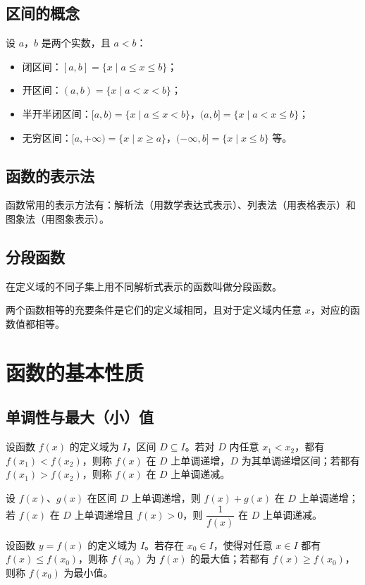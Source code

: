 \documentclass[lang=cn,newtx,10pt,scheme=chinese,nofont]{elegantbook}
\begin{document}
\subsection{区间的概念}
\begin{definition}[区间]
设 $a$，$b$ 是两个实数，且 $a<b$：
\begin{itemize}
    \item 闭区间：$[a,b]=\{x \mid a \leq x \leq b\}$；
    \item 开区间：$(a,b)=\{x \mid a<x<b\}$；
    \item 半开半闭区间：$[a,b)=\{x \mid a \leq x<b\}$，$(a,b]=\{x \mid a<x \leq b\}$；
    \item 无穷区间：$[a,+\infty)=\{x \mid x \geq a\}$，$(-\infty,b]=\{x \mid x \leq b\}$ 等。
\end{itemize}
\end{definition}
\subsection{函数的表示法}
\begin{definition}[函数的表示法]
函数常用的表示方法有：解析法（用数学表达式表示）、列表法（用表格表示）和图象法（用图象表示）。
\end{definition}
\subsection{分段函数}
\begin{definition}[分段函数]
在定义域的不同子集上用不同解析式表示的函数叫做分段函数。
\end{definition}
\begin{axiom}[函数相等的判定]
两个函数相等的充要条件是它们的定义域相同，且对于定义域内任意 $x$，对应的函数值都相等。
\end{axiom}

\section{函数的基本性质}
\subsection{单调性与最大（小）值}
\begin{definition}[增函数与减函数]
设函数 $f(x)$ 的定义域为 $I$，区间 $D \subseteq I$。若对 $D$ 内任意 $x_1<x_2$，都有 $f(x_1)<f(x_2)$，则称 $f(x)$ 在 $D$ 上单调递增，$D$ 为其单调递增区间；若都有 $f(x_1)>f(x_2)$，则称 $f(x)$ 在 $D$ 上单调递减。
\end{definition}
\begin{theorem}[单调性的运算性质]
设 $f(x)$、$g(x)$ 在区间 $D$ 上单调递增，则 $f(x)+g(x)$ 在 $D$ 上单调递增；若 $f(x)$ 在 $D$ 上单调递增且 $f(x)>0$，则 $\dfrac{1}{f(x)}$ 在 $D$ 上单调递减。
\end{theorem}
\begin{definition}[最大值与最小值]
设函数 $y=f(x)$ 的定义域为 $I$。若存在 $x_0 \in I$，使得对任意 $x \in I$ 都有 $f(x) \leq f(x_0)$，则称 $f(x_0)$ 为 $f(x)$ 的最大值；若都有 $f(x) \geq f(x_0)$，则称 $f(x_0)$ 为最小值。
\end{definition}
\end{document}
